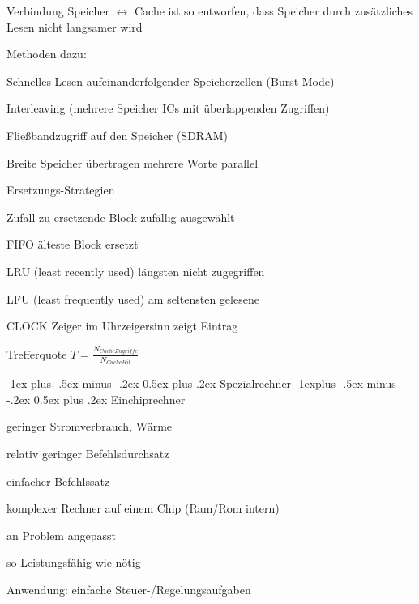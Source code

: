 \documentclass[10pt,landscape]{article}
\makeatletter
\renewcommand{\section}{\@startsection{section}{1}{0mm}%
                                {-1ex plus -.5ex minus -.2ex}%
                                {0.5ex plus .2ex}%
                                {\normalfont\large\bfseries}}
\renewcommand{\subsection}{\@startsection{subsection}{2}{0mm}%
                                {-1explus -.5ex minus -.2ex}%
                                {0.5ex plus .2ex}%
                                {\normalfont\normalsize\bfseries}}
\makeatother
\begin{document}
\begin{multicols}{3}
\begin{itemize*}
    \item Verbindung Speicher $\leftrightarrow$ Cache ist so entworfen, dass Speicher durch zusätzliches Lesen nicht langsamer wird
    \item Methoden dazu:
    \begin{itemize*}
      \item Schnelles Lesen aufeinanderfolgender Speicherzellen (Burst Mode)
      \item Interleaving (mehrere Speicher ICs mit überlappenden Zugriffen)
      \item Fließbandzugriff auf den Speicher (SDRAM)
      \item Breite Speicher übertragen mehrere Worte parallel
    \end{itemize*}
    \item Ersetzungs-Strategien
    \begin{description*}
      \item[Zufall] zu ersetzende Block zufällig ausgewählt
      \item[FIFO] älteste Block ersetzt
      \item[LRU](least recently used) längsten nicht zugegriffen
      \item[LFU](least frequently used) am seltensten gelesene
      \item[CLOCK] Zeiger im Uhrzeigersinn zeigt Eintrag
    \end{description*}
    \item Trefferquote $T=\frac{N_{Cache Zugriffe}}{N_{Cache Hit}}$
  \end{itemize*}
  
  \section{Spezialrechner}
  \subsection{Einchiprechner}
  \begin{itemize*}
    \item geringer Stromverbrauch, Wärme
    \item relativ geringer Befehlsdurchsatz
    \item einfacher Befehlssatz
    \item komplexer Rechner auf einem Chip (Ram/Rom intern)
    \item an Problem angepasst
    \item so Leistungsfähig wie nötig
    \item Anwendung: einfache Steuer-/Regelungsaufgaben
  \end{itemize*}
  

\end{multicols}
\end{document}
